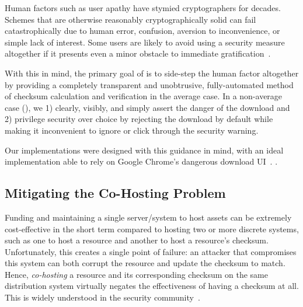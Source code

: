 Human factors such as user apathy have stymied cryptographers for decades.
Schemes that are otherwise reasonably cryptographically solid can fail
catastrophically due to human error, confusion, aversion to inconvenience, or
simple lack of interest. Some users are likely to avoid using a security measure
altogether if it presents even a minor obstacle to immediate
gratification~\cite{Clickthrough, PGPBad, Egelman1, Egelman2, Jenkins, Modic,
Reeder, Silic, Sunshine, Bianchi, Akhawe, Cherubini}.


With this in mind, the primary goal of \SYSTEM{} is to side-step the human
factor altogether by providing a completely transparent and unobtrusive,
fully-automated method of checksum calculation and verification in the average
case. In a non-average case (), we
1) clearly, visibly, and simply assert the danger of the download and 2)
privilege security over choice by rejecting the download by default while making
it inconvenient to ignore or click through the security warning.

Our implementations were designed with this guidance in mind, with an ideal
implementation able to rely on Google Chrome's dangerous download
UI~\cite{ChromeClickThrough}. .

\subsection{Mitigating the Co-Hosting Problem}

Funding and maintaining a single server/system to host assets can be extremely
cost-effective in the short term compared to hosting two or more discrete
systems, such as one to host a resource and another to host a resource's
checksum. Unfortunately, this creates a single point of failure: an attacker
that compromises this system can both corrupt the resource and update the
checksum to match. Hence, \emph{co-hosting} a resource and its
corresponding checksum on the same distribution system virtually negates the
effectiveness of having a checksum at all. This is widely understood in the
security community~\cite{SCA-MINT2, Cherubini, Stickler}.

